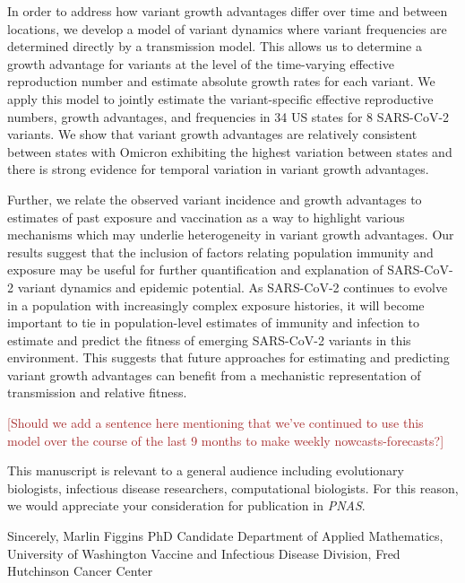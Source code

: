 \documentclass[11pt]{article}
\def\mfc#1{\textcolor{brown}{[#1]}}
\begin{document}
In order to address how variant growth advantages differ over time and between locations, we develop a model of variant dynamics where variant frequencies are determined directly by a transmission model.
This allows us to determine a growth advantage for variants at the level of the time-varying effective reproduction number and estimate absolute growth rates for each variant.
We apply this model to jointly estimate the variant-specific effective reproductive numbers, growth advantages, and frequencies in 34 US states for 8 SARS-CoV-2 variants.
We show that variant growth advantages are relatively consistent between states with Omicron exhibiting the highest variation between states and there is strong evidence for temporal variation in variant growth advantages.

Further, we relate the observed variant incidence and growth advantages to estimates of past exposure and vaccination as a way to highlight various mechanisms which may underlie heterogeneity in variant growth advantages.
Our results suggest that the inclusion of factors relating population immunity and exposure may be useful for further quantification and explanation of SARS-CoV-2 variant dynamics and epidemic potential.
As SARS-CoV-2 continues to evolve in a population with increasingly complex exposure histories, it will become important to tie in population-level estimates of immunity and infection to estimate and predict the fitness of emerging SARS-CoV-2 variants in this environment.
This suggests that future approaches for estimating and predicting variant growth advantages can benefit from a mechanistic representation of transmission and relative fitness.

\mfc{Should we add a sentence here mentioning that we've continued to use this model over the course of the last 9 months to make weekly nowcasts-forecasts?}

This manuscript is relevant to a general audience including evolutionary biologists, infectious disease researchers, computational biologists.
For this reason, we would appreciate your consideration for publication in \textit{PNAS}.

\vspace{0.3in} %

Sincerely, \newline
\vspace{0.05in} \newline
Marlin Figgins \newline
PhD Candidate \newline
Department of Applied Mathematics, University of Washington \newline
Vaccine and Infectious Disease Division, Fred Hutchinson Cancer Center
\end{document}
